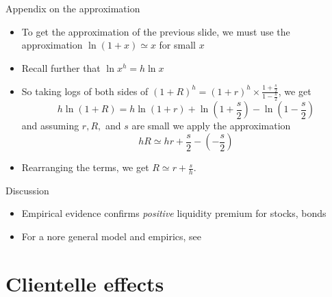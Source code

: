 \documentclass[english,10pt
,aspectratio=169
]{beamer}
\begin{document}
\begin{frame}{Appendix on the approximation}
	\begin{itemize}
		\item To get the approximation of the previous slide, we must use the approximation $\ln (1+x) \simeq x$ for small $x$
		\item Recall further that $\ln x^h = h \ln x$
		\item So taking logs of both sides of $(1+R)^h = (1+r)^h \times \frac{1+\frac{s}{2}}{1-\frac{s}{2}}$, we get
		\[
		h \ln (1+R) = h\ln (1+r) + \ln \left(1+\frac{s}{2} \right) - \ln \left( 1-\frac{s}{2} \right) 
		\]
		and assuming $r, R,$ and $s$ are small we apply the approximation
		\[
		hR \simeq hr+\frac{s}{2}- \left(-\frac{s}{2}\right)
		\]
		\item Rearranging the terms, we get $R \simeq r+\frac{s}{h}$.
	\end{itemize}
\end{frame}


\begin{frame}{Discussion}
	\begin{itemize}
		\item Empirical evidence confirms \emph{positive} liquidity premium for stocks, bonds
		\item For a nore general model and empirics, see \citet*{bongaerts_derivative_2011}
	\end{itemize}
\end{frame}



\section{Clientelle effects}
\end{document}
